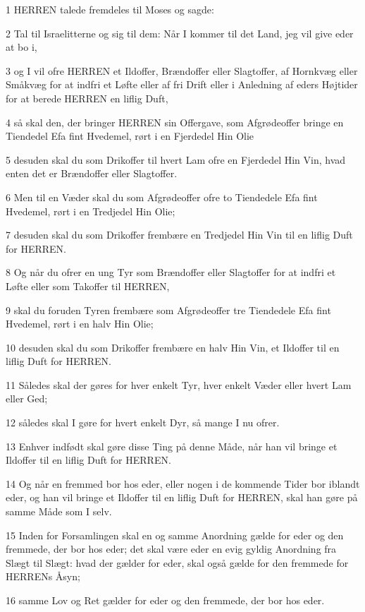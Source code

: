 \par 1 HERREN talede fremdeles til Moses og sagde:
\par 2 Tal til Israelitterne og sig til dem: Når I kommer til det Land, jeg vil give eder at bo i,
\par 3 og I vil ofre HERREN et Ildoffer, Brændoffer eller Slagtoffer, af Hornkvæg eller Småkvæg for at indfri et Løfte eller af fri Drift eller i Anledning af eders Højtider for at berede HERREN en liflig Duft,
\par 4 så skal den, der bringer HERREN sin Offergave, som Afgrødeoffer bringe en Tiendedel Efa fint Hvedemel, rørt i en Fjerdedel Hin Olie
\par 5 desuden skal du som Drikoffer til hvert Lam ofre en Fjerdedel Hin Vin, hvad enten det er Brændoffer eller Slagtoffer.
\par 6 Men til en Væder skal du som Afgrødeoffer ofre to Tiendedele Efa fint Hvedemel, rørt i en Tredjedel Hin Olie;
\par 7 desuden skal du som Drikoffer frembære en Tredjedel Hin Vin til en liflig Duft for HERREN.
\par 8 Og når du ofrer en ung Tyr som Brændoffer eller Slagtoffer for at indfri et Løfte eller som Takoffer til HERREN,
\par 9 skal du foruden Tyren frembære som Afgrødeoffer tre Tiendedele Efa fint Hvedemel, rørt i en halv Hin Olie;
\par 10 desuden skal du som Drikoffer frembære en halv Hin Vin, et Ildoffer til en liflig Duft for HERREN.
\par 11 Således skal der gøres for hver enkelt Tyr, hver enkelt Væder eller hvert Lam eller Ged;
\par 12 således skal I gøre for hvert enkelt Dyr, så mange I nu ofrer.
\par 13 Enhver indfødt skal gøre disse Ting på denne Måde, når han vil bringe et Ildoffer til en liflig Duft for HERREN.
\par 14 Og når en fremmed bor hos eder, eller nogen i de kommende Tider bor iblandt eder, og han vil bringe et Ildoffer til en liflig Duft for HERREN, skal han gøre på samme Måde som I selv.
\par 15 Inden for Forsamlingen skal en og samme Anordning gælde for eder og den fremmede, der bor hos eder; det skal være eder en evig gyldig Anordning fra Slægt til Slægt: hvad der gælder for eder, skal også gælde for den fremmede for HERRENs Åsyn;
\par 16 samme Lov og Ret gælder for eder og den fremmede, der bor hos eder.
